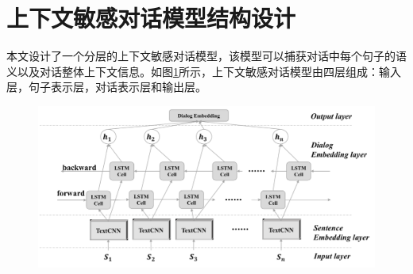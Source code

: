 \section{上下文敏感对话模型结构设计}
本文设计了一个分层的上下文敏感对话模型{\dm}，该模型可以捕获对话中每个句子的语义以及对话整体上下文信息。如图\ref{fig:model}所示，上下文敏感对话模型由四层组成：输入层，句子表示层，对话表示层和输出层。
\begin{figure}[htbp]
    \centering
    \includegraphics[width=\textwidth]{Img/dialog-model.pdf}
    \label{fig:model}
\end{figure}





